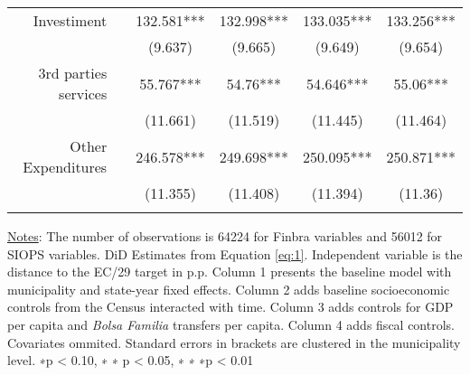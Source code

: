 \begin{table}[h!]
\begin{footnotesize}
\begin{center}
{\begin{threeparttable}[b]
\begin{tabular}{rrrrrr}
    \multicolumn{1}{p{17.645em}}{Investiment} &       & \multicolumn{1}{c}{132.581***} & \multicolumn{1}{c}{132.998***} & \multicolumn{1}{c}{133.035***} & \multicolumn{1}{c}{133.256***} \\
          &       & \multicolumn{1}{c}{(9.637)} & \multicolumn{1}{c}{(9.665)} & \multicolumn{1}{c}{(9.649)} & \multicolumn{1}{c}{(9.654)} \\
    \multicolumn{1}{p{17.645em}}{3rd parties services} &       & \multicolumn{1}{c}{55.767***} & \multicolumn{1}{c}{54.76***} & \multicolumn{1}{c}{54.646***} & \multicolumn{1}{c}{55.06***} \\
          &       & \multicolumn{1}{c}{(11.661)} & \multicolumn{1}{c}{(11.519)} & \multicolumn{1}{c}{(11.445)} & \multicolumn{1}{c}{(11.464)} \\
    \multicolumn{1}{p{17.645em}}{Other Expenditures} &       & \multicolumn{1}{c}{246.578***} & \multicolumn{1}{c}{249.698***} & \multicolumn{1}{c}{250.095***} & \multicolumn{1}{c}{250.871***} \\
          &       & \multicolumn{1}{c}{(11.355)} & \multicolumn{1}{c}{(11.408)} & \multicolumn{1}{c}{(11.394)} & \multicolumn{1}{c}{(11.36)} \\
          &       &       &       &       &  \\
    \bottomrule
    \bottomrule
    \end{tabular}%
    
    
  \label{table:fiscal}%
  
  \begin{tablenotes}
  \scriptsize{\underline{Notes}: The number of observations is 64224 for Finbra variables and  56012 for SIOPS variables.  DiD Estimates from Equation \ref{eq:1}. Independent variable is the distance to the EC/29 target in p.p. Column 1 presents the baseline model with municipality and state-year fixed effects. Column 2 adds baseline socioeconomic controls from the Census interacted with time. Column 3 adds controls for GDP per capita and \emph{Bolsa Familia} transfers per capita. Column 4 adds fiscal controls. Covariates ommited. Standard errors in brackets are clustered in the municipality level. ∗p < 0.10, ∗ ∗ p < 0.05, ∗ ∗ ∗p < 0.01}
  \end{tablenotes}

\end{threeparttable}
}
\end{center}
\end{footnotesize}
\end{table}